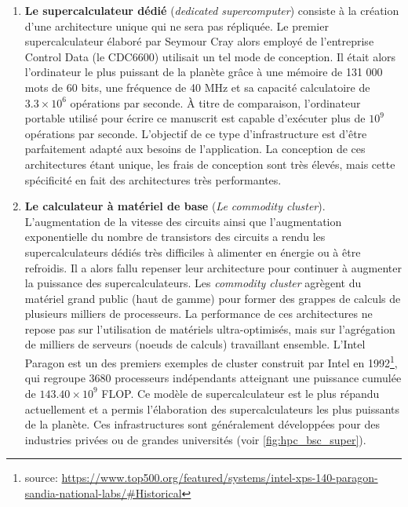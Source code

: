    \begin{enumerate}
        \item \textbf{Le supercalculateur dédié} (\textit{dedicated supercomputer}) consiste à la création d'une architecture unique qui ne sera pas répliquée. Le premier supercalculateur élaboré par Seymour Cray alors employé de l'entreprise Control Data (le CDC6600) utilisait un tel mode de conception. Il était alors l'ordinateur le plus puissant de la planète grâce à une mémoire de 131 000 mots de 60 bits, une fréquence de 40 MHz et sa capacité calculatoire de $3.3 \times 10^6$ opérations par seconde. À titre de comparaison, l'ordinateur portable utilisé pour écrire ce manuscrit est capable d'exécuter plus de $10^9$ opérations par seconde. L'objectif de ce type d'infrastructure est d'être parfaitement adapté aux besoins de l'application. La conception de ces architectures étant unique, les frais de conception sont très élevés, mais cette spécificité en fait des architectures très performantes. 
        
        \item \textbf{Le calculateur à matériel de base} (\textit{Le commodity cluster}). L'augmentation de la vitesse des circuits ainsi que l'augmentation exponentielle du nombre de transistors des circuits a rendu les supercalculateurs dédiés très difficiles à alimenter en énergie ou à être refroidis. Il a alors fallu repenser leur architecture pour continuer à augmenter la puissance des supercalculateurs. Les \textit{commodity cluster} agrègent du matériel grand public (haut de gamme) pour former des grappes de calculs de plusieurs milliers de processeurs. La performance de ces architectures ne repose pas sur l'utilisation de matériels ultra-optimisés, mais sur l'agrégation de milliers de serveurs (noeuds de calculs) travaillant ensemble. L'Intel Paragon est un des premiers exemples de cluster construit par Intel en 1992\footnote{source: \url{https://www.top500.org/featured/systems/intel-xps-140-paragon-sandia-national-labs/\#Historical}}, qui regroupe 3680 processeurs indépendants atteignant une puissance cumulée de $143.40 \times 10^9$ \gls{FLOP}. Ce modèle de supercalculateur est le plus répandu actuellement et a permis l'élaboration des supercalculateurs les plus puissants de la planète. Ces infrastructures sont généralement développées pour des industries privées ou de grandes universités (voir \autoref{fig:hpc_bsc_super}).
        

\end{enumerate}
